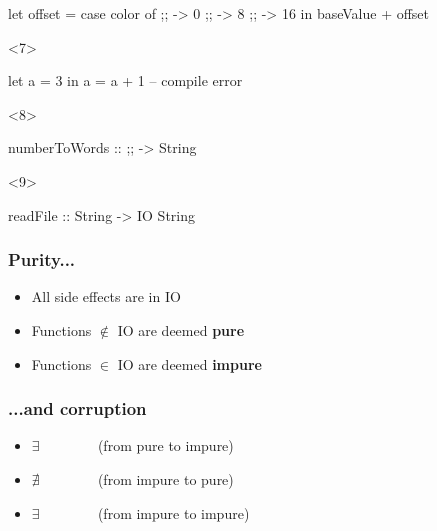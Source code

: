\documentclass[17pt]{beamer}
\renewcommand{\(}[1]{\begin{columns}[#1]}
\renewcommand{\)}{\end{columns}}
\newcommand{\<}[1]{\begin{column}{#1}}
\renewcommand{\>}{\end{column}}
\begin{document}
\begin{frame}[fragile]
\begin{minipage}[c][.5\textheight]{\textwidth}
\begin{center}
\begin{onlyenv}
      \begin{code}[gobble=8]
        let offset = case color of
                         ;;   ->  0
                         ;; ->  8
                         ;;  -> 16
        in baseValue + offset
      \end{code}
    \end{onlyenv}
    \begin{onlyenv}<7>
      \vfill
      \begin{code}[gobble=8]
        let a = 3
        in  a = a + 1 -- compile error
      \end{code}
      \vfill
    \end{onlyenv}
    \begin{onlyenv}<8>
      \begin{code}[gobble=8]
        numberToWords :: ;; -> String
      \end{code}
    \end{onlyenv}
    \begin{onlyenv}<9>
      \begin{code}[gobble=8]
        readFile :: String -> IO String
      \end{code}
    \end{onlyenv}
  \end{center}
  \end{minipage}
\end{frame}

\begin{frame}[fragile]
  \frametitle{Purity...}
  \begin{itemize}
  \item All side effects are in IO
  \item<2-> Functions $\not\in$ IO are deemed \textbf{pure}
  \item<3-> Functions $\in$ IO are deemed \textbf{impure}
  \end{itemize}
\end{frame}

\begin{frame}[fragile]
  \frametitle{...and corruption}
  \begin{itemize}
  \item $\exists$ ~~ ~~~~~{\small (from pure to impure)}
  \item $\nexists$ ~~ ~~~~~{\small (from impure to pure)}
  \item<3-> $\exists$ ~~ ~~~~~{\small (from impure to impure)}
  \end{itemize}

  \begin{center}
  \end{center}
\end{frame}
\end{document}
